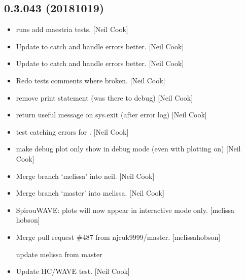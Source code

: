 \documentclass[a4paper,10pt,english]{report}
\begin{document}
\subsection{0.3.043 (2018\sphinxhyphen{}10\sphinxhyphen{}19)}
\label{\detokenize{misc/changelog:id306}}\begin{itemize}
\item {} 
 runs \sphinxhyphen{} add maestria tests. {[}Neil Cook{]}

\item {} 
Update  to catch and handle errors better. {[}Neil
Cook{]}

\item {} 
Update  to catch and handle errors better. {[}Neil
Cook{]}

\item {} 
Redo tests \sphinxhyphen{} comments where broken. {[}Neil Cook{]}

\item {} 
 \sphinxhyphen{} remove print statement (was there to debug) {[}Neil
Cook{]}

\item {} 
 \sphinxhyphen{} return useful message on sys.exit (after error log)
{[}Neil Cook{]}

\item {} 
 \sphinxhyphen{} test catching errors for . {[}Neil
Cook{]}

\item {} 
 \sphinxhyphen{} make debug plot only show in debug mode (even with
plotting on) {[}Neil Cook{]}

\item {} 
Merge branch ‘melissa’ into neil. {[}Neil Cook{]}

\item {} 
Merge branch ‘master’ into melissa. {[}Neil Cook{]}

\item {} 
SpirouWAVE: plots will now appear in interactive mode only. {[}melissa\sphinxhyphen{}
hobson{]}

\item {} 
Merge pull request \#487 from njcuk9999/master. {[}melissa\sphinxhyphen{}hobson{]}

update melissa from master

\item {} 
Update HC/WAVE test. {[}Neil Cook{]}


\end{itemize}
\end{document}
